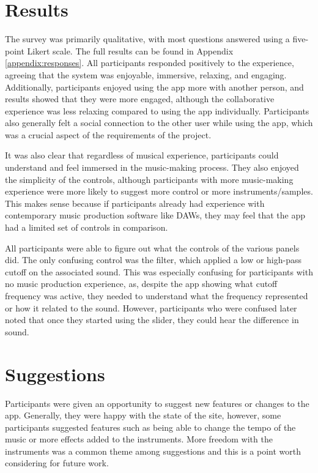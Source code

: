 \section{Results}
The survey was primarily qualitative, with most questions answered using a five-point Likert scale. The full results can be found in Appendix \ref{appendix:responses}. All participants responded positively to the experience, agreeing that the system was enjoyable, immersive, relaxing, and engaging. Additionally, participants enjoyed using the app more with another person, and results showed that they were more engaged, although the collaborative experience was less relaxing compared to using the app individually. Participants also generally felt a social connection to the other user while using the app, which was a crucial aspect of the requirements of the project.

It was also clear that regardless of musical experience, participants could understand and feel immersed in the music-making process. They also enjoyed the simplicity of the controls, although participants with more music-making experience were more likely to suggest more control or more instruments/samples. This makes sense because if participants already had experience with contemporary music production software like DAWs, they may feel that the app had a limited set of controls in comparison.

All participants were able to figure out what the controls of the various panels did. The only confusing control was the filter, which applied a low or high-pass cutoff on the associated sound. This was especially confusing for participants with no music production experience, as, despite the app showing what cutoff frequency was active, they needed to understand what the frequency represented or how it related to the sound. However, participants who were confused later noted that once they started using the slider, they could hear the difference in sound.

\section{Suggestions}
Participants were given an opportunity to suggest new features or changes to the app. Generally, they were happy with the state of the site, however, some participants suggested features such as being able to change the tempo of the music or more effects added to the instruments. More freedom with the instruments was a common theme among suggestions and this is a point worth considering for future work.

